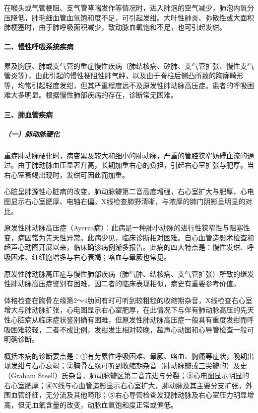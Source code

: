 在喉头或气管梗阻、支气管哮喘发作等情况时，进入肺泡的空气减少，肺泡内氧分压降低，肺毛细血管血氧饱和度不足，可引起发绀。大叶性肺炎、弥散性或大面积肺梗塞时，由于肺呼吸面积减少，致动脉血氧饱和不足，也可引起发绀。

\paragraph{二、慢性呼吸系统疾病}

累及胸膜、肺或支气管的重症慢性疾病（肺结核病、矽肺、支气管扩张、慢性支气管炎等），由此引起的慢性梗阻性肺气肿，以及由于脊柱后侧凸所致的胸廓畸形等，均常引起轻度发绀，但其严重程度远不及原发性肺动脉高压症。患者的呼吸困难大多明显。根据慢性肺部疾病的存在，诊断常无困难。

\paragraph{三、肺血管疾病}

\subparagraph{（一）肺动脉硬化}

重症肺动脉硬化时，病变累及较大和细小的肺动脉，严重的管腔狭窄妨碍血流的通过。由于肺动脉血压显著升高，长期加重右心的负担，引起右心室扩张与肥厚。当右心室衰竭出现时，发绀可因此而加重。

心脏呈肺源性心脏病的改变，肺动脉瓣第二音高度增强，右心室扩大与肥厚，心电图显示右心室肥厚、电轴右偏。X线检查肺野清晰，与浓厚的肺门阴影呈明显的对比。

原发性肺动脉高压症（Ayerza病）：此病是一种肺小动脉的进行性狭窄性与阻塞性变，病因常为先天性异常。此病少见，临床诊断相对困难。自心血管造影术检查和超声心动图开展以来，临床确诊病例渐多报告。此病的四大特点是：慢性发绀、呼吸困难、红细胞增多与右心衰竭；咯血与晕厥也常见。

原发性肺动脉高压症与慢性肺部疾病（肺气肿、结核病、支气管扩张）所致的继发性肺动脉高压症鉴别有困难，因二者的临床表现相似，病史有重要参考价值。

体格检查在胸骨左缘第2～4肋间有时可听到较粗糙的收缩期杂音，X线检查右心室增大与肺动脉扩张，心电图显示右心室肥厚，在此情况下与伴有肺动脉高压的先天性心脏病从临床症状鉴别确有困难，但原发性肺动脉高压症一般具有重度发绀而呼吸困难较轻，二者不成比例，发绀发生相对较晚，超声心动图和心导管检查一般可明确诊断。

概括本病的诊断要点是：①有劳累性呼吸困难、晕厥、咯血、胸痛等症状，晚期出现发绀与右心衰竭；②胸骨左缘可听到收缩期杂音（肺动脉瓣或三尖瓣的）及史（Graham
Steell）氏杂音，肺动脉瓣区第二音亢进与分裂；③心电图显示明显的右心室肥厚；④X线与心血管造影显示右心室扩大，肺动脉及其主要分支扩张，外围血管纤细，无分流及其他畸形；⑤右心导管检查发现肺动脉及右心室压力明显增高，但无血氧含量的改变，动脉血氧饱和度正常或偏低。

